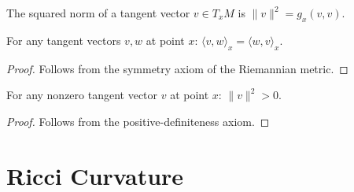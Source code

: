 \begin{definition}
\label{def:norm_sq}
\leanok
{}
The squared norm of a tangent vector $v \in T_xM$ is $\|v\|^2 = g_x(v, v)$.
\end{definition}

\begin{lemma}
\label{lem:inner_product_symm}
\leanok
{}
For any tangent vectors $v, w$ at point $x$: $\langle v, w \rangle_x = \langle w, v \rangle_x$.
\end{lemma}

\begin{proof}
\leanok
{}
Follows from the symmetry axiom of the Riemannian metric.
\end{proof}

\begin{lemma}
\label{lem:norm_sq_pos}
\leanok
{}
For any nonzero tangent vector $v$ at point $x$: $\|v\|^2 > 0$.
\end{lemma}

\begin{proof}
\leanok
{}
Follows from the positive-definiteness axiom.
\end{proof}

\chapter{Ricci Curvature}
\label{chap:ricci}

